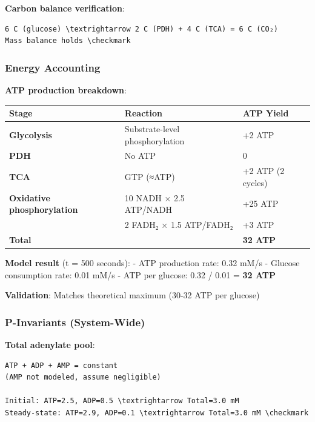 \textbf{Carbon balance verification}:

\begin{lstlisting}
6 C (glucose) \textrightarrow 2 C (PDH) + 4 C (TCA) = 6 C (CO₂)
Mass balance holds \checkmark
\end{lstlisting}

\hypertarget{energy-accounting}{%
\subsubsection{Energy Accounting}\label{energy-accounting}}

\textbf{ATP production breakdown}:

\begin{longtable}[]{@{}lll@{}}
\toprule\noalign{}
Stage & Reaction & ATP Yield \\
\midrule\noalign{}
\endhead
\bottomrule\noalign{}
\endlastfoot
\textbf{Glycolysis} & Substrate-level phosphorylation & +2 ATP \\
\textbf{PDH} & No ATP & 0 \\
\textbf{TCA} & GTP (≈ATP) & +2 ATP (2 cycles) \\
\textbf{Oxidative phosphorylation} & 10 NADH × 2.5 ATP/NADH & +25 ATP \\
& 2 FADH₂ × 1.5 ATP/FADH₂ & +3 ATP \\
\textbf{Total} & & \textbf{32 ATP} \\
\end{longtable}

\textbf{Model result} (t = 500 seconds): - ATP production rate: 0.32
mM/s - Glucose consumption rate: 0.01 mM/s - ATP per glucose: 0.32 /
0.01 = \textbf{32 ATP} \checkmark

\textbf{Validation}: Matches theoretical maximum (30-32 ATP per glucose)
\checkmark

\hypertarget{p-invariants-system-wide}{%
\subsubsection{P-Invariants
(System-Wide)}\label{p-invariants-system-wide}}

\textbf{Total adenylate pool}:

\begin{lstlisting}
ATP + ADP + AMP = constant
(AMP not modeled, assume negligible)

Initial: ATP=2.5, ADP=0.5 \textrightarrow Total=3.0 mM
Steady-state: ATP=2.9, ADP=0.1 \textrightarrow Total=3.0 mM \checkmark
\end{lstlisting}

